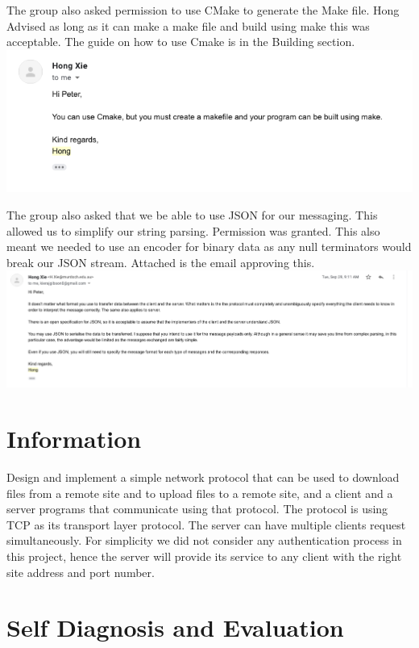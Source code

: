 \documentclass{article}
\begin{document}
The group also asked permission to use CMake to generate the Make file. Hong Advised as long as it can make a make file and build using make this was acceptable. The guide on how to use Cmake is in the Building section.\\
\includegraphics[width=\textwidth]{make}

The group also asked that we be able to use JSON for our messaging. This allowed us to simplify our string parsing. Permission was granted. This also meant we needed to use an encoder for binary data as any null terminators would break our JSON stream. Attached is the email approving this.\\
\includegraphics[width=\textwidth]{json}

\section{Information}
Design and implement a simple network protocol that can be used to download files from a remote site and to upload files to a remote site, and a client and a server programs that communicate using that protocol. The protocol is using TCP as its transport layer protocol. The server can have multiple clients request simultaneously. For simplicity we did not consider any authentication process in this project, hence the server will provide its service to any client with the right site address and port number.

\section{Self Diagnosis and Evaluation}
\end{document}
